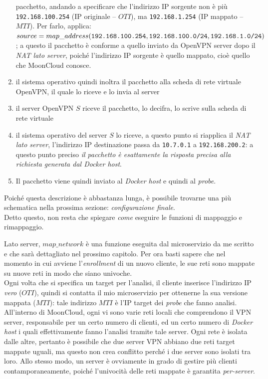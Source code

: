 \begin{enumerate}
  pacchetto, andando a specificare che l'indirizzo IP sorgente non è più
  \texttt{192.168.100.254} (IP originale -- $OTI$), ma \texttt{192.168.1.254}
  (IP mappato -- $MTI$). Per farlo, applica:
  $source=map\_address(\texttt{192.168.100.254}, \texttt{192.168.100.0/24},\\
  \texttt{192.168.1.0/24})$
  ; a questo il pacchetto è conforme a quello inviato da OpenVPN server dopo il
  \textit{NAT lato server}, poiché l'indirizzo IP sorgente è quello mappato, cioè quello
  che MoonCloud conosce.
  \item il sistema operativo quindi inoltra il pacchetto alla scheda di rete virtuale
  OpenVPN, il quale lo riceve e lo invia al server
  \item il server OpenVPN $S$ riceve il pacchetto, lo decifra, lo scrive sulla scheda di rete
  virtuale
  \item il sistema operativo del server $S$ lo riceve, a questo punto si riapplica
  il \textit{NAT lato server}, l'indirizzo IP destinazione passa da \texttt{10.7.0.1}
  a \texttt{192.168.200.2}: a questo punto preciso \textit{il pacchetto è esattamente
  la risposta precisa alla richiesta generata dal Docker host}.
  \item Il pacchetto viene quindi inviato al \textit{Docker host} e quindi al \textit{probe}.
\end{enumerate}
Poiché questa descrizione è abbastanza lunga, è possibile trovarne una più schematica
nella prossima sezione: \textit{configurazione finale}.\\
Detto questo, non resta che spiegare \textit{come} eseguire le funzioni di mappaggio
e rimappaggio.


Lato server, $map\_network$ è una funzione eseguita dal microservizio da me scritto
e che sarà dettagliato nel prossimo capitolo. Per ora basti sapere che nel momento
in cui avviene l'\textit{enrollment} di un nuovo cliente, le sue reti sono mappate
su nuove reti in modo che siano univoche.\\
Ogni volta che si specifica un target per l'analisi, il cliente inserisce l'indirizzo IP
\textit{vero} ($OTI$), quindi si contatta il mio microservizio per ottenerne
la sua versione mappata ($MTI$): tale indirizzo $MTI$ è l'IP target dei \textit{probe}
che fanno analisi.\\
All'interno di MoonCloud, ogni vi sono varie reti locali che comprendono il VPN server,
responsabile per un certo numero di clienti, ed un certo numero di \textit{Docker host}
i quali effettivamente fanno l'analisi tramite tale server. Ogni rete è isolata
dalle altre, pertanto è possibile che due server VPN abbiano due reti target mappate
uguali, ma questo non crea conflitto perché i due server sono isolati tra loro.
Allo stesso modo, un server è ovviamente in grado di gestire più clienti
contamporaneamente, poiché l'univocità delle reti mappate è garantita \textit{per-server}.


